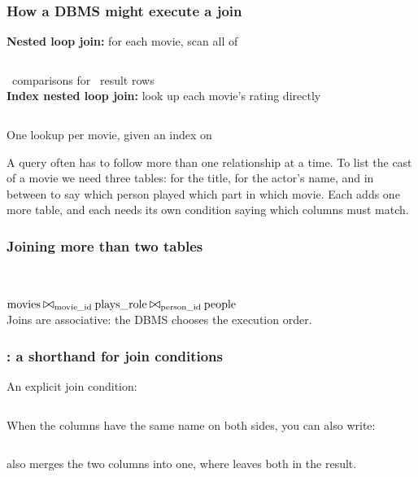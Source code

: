 \begin{frame}
    \label{s:join-algorithms}
    \frametitle{How a DBMS might execute a join}
    \textbf{Nested loop join:} for each movie, scan all of 
    \vspace{0.2em}
    \inputminted[fontsize=\footnotesize]{python}{code/join-nested-loop.py}
    \vspace{0.2em}
    \dbrowsmoviesratings\ comparisons for \dbrowsratings\ result rows\\[1em]\pause
    \textbf{Index nested loop join:} look up each movie's rating directly
    \vspace{0.2em}
    \inputminted[fontsize=\footnotesize]{python}{code/join-python.py}
    \vspace{0.2em}
    One lookup per movie, given an index on 
\end{frame}
\label{l:join-algorithms}

A query often has to follow more than one relationship at a time.
To list the cast of a movie we need three tables:  for the title,  for the actor's name, and  in between to say which person played which part in which movie.
Each  adds one more table, and each needs its own  condition saying which columns must match.

\begin{frame}
    \label{s:multi-join}
    \frametitle{Joining more than two tables}
    \inputminted[fontsize=\footnotesize]{sql}{code/sql-join3.sql}
    \vspace{0.4em}
    {\footnotesize}\\[0.7em]\pause
    $\ra{movies} \rabin{\bowtie}_{\ra{movie\_id}} \ra{plays\_role}
      \rabin{\bowtie}_{\ra{person\_id}} \ra{people}$\\[0.5em]
    Joins are associative: the DBMS chooses the execution order.
\end{frame}
\label{l:multi-join}

\begin{frame}
    \label{s:using}
    \frametitle{: a shorthand for join conditions}
    An explicit join condition:
    \inputminted[fontsize=\footnotesize]{sql}{code/join-on.sql}
    \vspace{0.6em}\pause
    When the columns have the same name on both sides, you can also write:
    \inputminted[fontsize=\footnotesize]{sql}{code/join-using.sql}
    \vspace{0.6em}\pause
     also merges the two  columns into one,
    where  leaves both in the result.
\end{frame}
\label{l:using}

